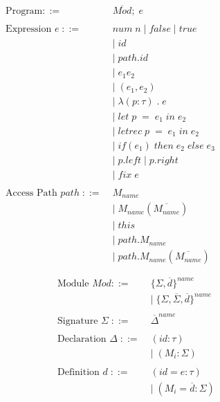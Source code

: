 \documentclass[10pt,a4paper,draft]{article}
\begin{document}
\begin{flushleft}
\begin{figure}[!htbp]
\begin{align*}
\begin{aligned}
\text{Program} ::= \; & \overline{\mathit{Mod}};\;e\\
\\
\text{Expression }e \; ::= \; &\mathit{num \; n \;} | \; \mathit{false} \; | \; \mathit{true} \\
&|\;\mathit{id}  \\
&|\;\mathit{path.id} \\
&|\;e_{1}e_{2} \\
&|\;(e_{1},e_{2}) \\
&|\;\lambda(p:\tau)\;.\;e \\
&|\;\mathit{let }\; p \; = \; e_{1} \; in \; e_{2} \\
&|\;\mathit{letrec} \; p \; = \; e_{1} \; in \; e_{2} \\
&|\; \mathit{if(e_{1}) \; then \; e_{2} \; else \; e_{3}}\\
&|\;\mathit{p.left}\; | \; \mathit{p.right} \\
&|\;\mathit{fix\;e} \\
\\
\text{Access Path } \mathit{path} \; ::= \; &\mathit{M_{name}}\\
&|\;M_{name}(\overline{\mathit{M_{name}}})\\
&|\;\mathit{this}\\
&|\;\mathit{path.M_{name}}\\
&|\;\mathit{path.M_{name}(\overline{\mathit{M_{name}}})}\\
\\
\end{aligned}
\begin{aligned}
\text{Module } \mathit{Mod} ::= \; &\lbrace \Sigma, \overline{\mathit{d}}\rbrace^{name}\\
&|\;\lbrace \Sigma, \overline{\Sigma}, \overline{d} \rbrace^{name} \\
\\
\text{Signature } \Sigma \; ::=\; & \overline{\Delta}^{name}\\
\\
\text{Declaration } \Delta \; ::=\; & (\mathit{id}:\tau)\\
& | \; (\mathit{M_{i}}:\Sigma)\\
\\
\text{Definition } d \; ::= \; &(\mathit{id}=e:\tau)\\
& | \; (\mathit{M_{i}} = \overline{d} : \Sigma) \\

\end{aligned}
\end{align*}
\end{figure}
\end{flushleft}
\end{document}

